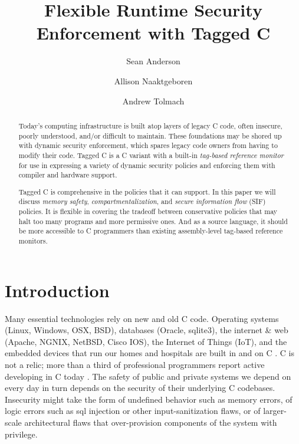 \documentclass{llncs}
\title{Flexible Runtime Security Enforcement with Tagged C}
\author{Sean Anderson \and Allison Naaktgeboren \and Andrew Tolmach}
\institute{Portland State University}
\begin{document}





\begin{abstract}
Today's computing infrastructure is built atop layers of legacy C code, often
insecure, poorly understood, and/or difficult to maintain.
These foundations may be shored up with dynamic security enforcement,
which spares legacy code owners from having to modify their code.
Tagged C is a C variant with a built-in {\em tag-based reference monitor} for use in expressing
a variety of dynamic security policies and enforcing them with compiler and hardware support.

Tagged C is comprehensive in the policies that it can support. In this paper we will discuss
{\em memory safety}, {\em compartmentalization}, and {\em secure information flow} (SIF)
policies. It is flexible in covering the tradeoff between conservative policies that may
halt too many programs and more permissive ones. And as a source language, it should be
more accessible to C programmers than existing assembly-level tag-based reference monitors.

\end{abstract}

\maketitle

\section{Introduction}
Many essential technologies rely on new and old C code. 
Operating systems (Linux, Windows, OSX, BSD), databases (Oracle, sqlite3), the internet \&
web (Apache, NGNIX, NetBSD, Cisco IOS), the Internet of Things (IoT), and the 
embedded devices that run our homes and hospitals are built in and on C \cite{Munoz:PoweredbyC}. 
C is not a relic; more than a third of professional programmers report active developing
in C today \cite{stackoverflow22:dev-survey}. The safety of public and private systems we depend on every day
in turn depends on the security of their underlying C codebases. Insecurity might take the form
of undefined behavior such as memory errors, of logic errors such as sql injection or other
input-sanitization flaws, or of larger-scale architectural flaws that over-provision components of the
system with privilege.
\end{document}
